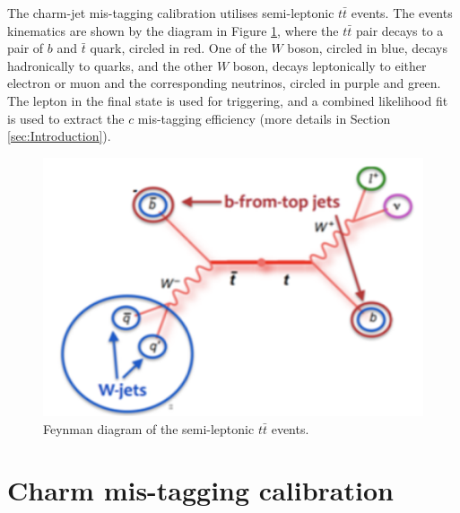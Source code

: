 \documentclass[letterpaper,12pt]{article}
\begin{document}
The charm-jet mis-tagging calibration utilises semi-leptonic $t\bar{t}$ 
events. The events kinematics are shown by the diagram in 
Figure \ref{fig:feynman}, where the $t\bar{t}$ pair decays to a 
pair of $b$ and $\bar{t}$ quark, circled in red. One of the $W$ boson, 
circled in blue, decays hadronically to quarks, and the other $W$ boson, 
decays leptonically to either electron or muon and the corresponding neutrinos, 
circled in purple and green. The lepton in the final state is used for 
triggering, and a combined likelihood fit is used to extract the $c$ mis-tagging 
efficiency (more details in Section \ref{sec:Introduction}). 

\begin{figure}[H]
\centering
\begin{minipage}[b]{.45\textwidth}
\centering
\includegraphics[width=1\textwidth]{feynman.png}
\end{minipage}
\caption{Feynman diagram of the semi-leptonic $t\bar{t}$ events.}
\label{fig:feynman}
\end{figure}
\section{Charm mis-tagging calibration}
\label{charm mistagging}
\end{document}
